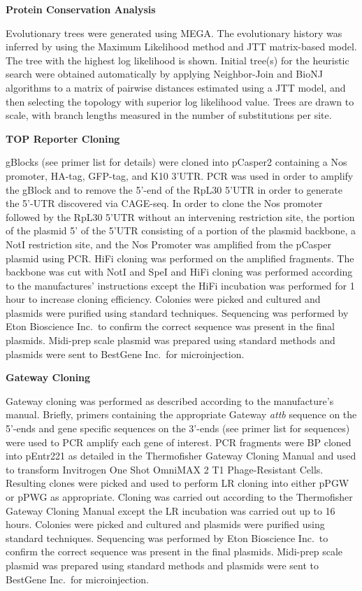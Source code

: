 \documentclass[12pt,oneside]{reedthesis}
\begin{document}
\textbf{Protein Conservation Analysis}

Evolutionary trees were generated using MEGA. The evolutionary history was inferred by using the Maximum Likelihood method and JTT matrix-based model. The tree with the highest log likelihood is shown. Initial tree(s) for the heuristic search were obtained automatically by applying Neighbor-Join and BioNJ algorithms to a matrix of pairwise distances estimated using a JTT model, and then selecting the topology with superior log likelihood value. Trees are drawn to scale, with branch lengths measured in the number of substitutions per site.

\textbf{TOP Reporter Cloning}

gBlocks (see primer list for details) were cloned into pCasper2 containing a Nos promoter, HA-tag, GFP-tag, and K10 3'UTR. PCR was used in order to amplify the gBlock and to remove the 5'-end of the RpL30 5'UTR in order to generate the 5'-UTR discovered via CAGE-seq. In order to clone the Nos promoter followed by the RpL30 5'UTR without an intervening restriction site, the portion of the plasmid 5' of the 5'UTR consisting of a portion of the plasmid backbone, a NotI restriction site, and the Nos Promoter was amplified from the pCasper plasmid using PCR. HiFi cloning was performed on the amplified fragments. The backbone was cut with NotI and SpeI and HiFi cloning was performed according to the manufactures' instructions except the HiFi incubation was performed for 1 hour to increase cloning efficiency. Colonies were picked and cultured and plasmids were purified using standard techniques. Sequencing was performed by Eton Bioscience Inc.~to confirm the correct sequence was present in the final plasmids. Midi-prep scale plasmid was prepared using standard methods and plasmids were sent to BestGene Inc.~for microinjection.

\textbf{Gateway Cloning}

Gateway cloning was performed as described according to the manufacture's manual. Briefly, primers containing the appropriate Gateway \emph{attb} sequence on the 5'-ends and gene specific sequences on the 3'-ends (see primer list for sequences) were used to PCR amplify each gene of interest. PCR fragments were BP cloned into pEntr221 as detailed in the Thermofisher Gateway Cloning Manual and used to transform Invitrogen One Shot OmniMAX 2 T1 Phage-Resistant Cells. Resulting clones were picked and used to perform LR cloning into either pPGW or pPWG as appropriate. Cloning was carried out according to the Thermofisher Gateway Cloning Manual except the LR incubation was carried out up to 16 hours. Colonies were picked and cultured and plasmids were purified using standard techniques. Sequencing was performed by Eton Bioscience Inc.~to confirm the correct sequence was present in the final plasmids. Midi-prep scale plasmid was prepared using standard methods and plasmids were sent to BestGene Inc.~for microinjection.
\end{document}
